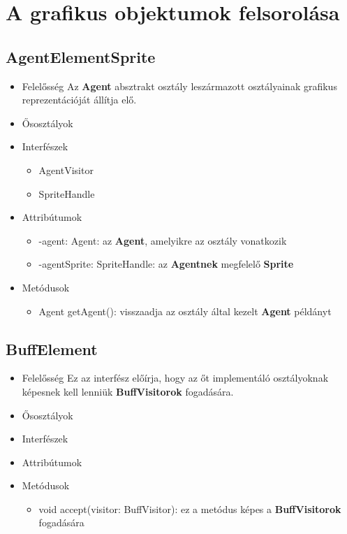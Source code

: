 \section{A grafikus objektumok felsorolása}

\subsection{AgentElementSprite}
\begin{itemize}
\item Felelősség \newline
    Az \textbf{Agent} absztrakt osztály leszármazott osztályainak grafikus reprezentációját állítja elő.
\item Ősosztályok
\item Interfészek
    \begin{itemize}
        \item AgentVisitor
        \item SpriteHandle
    \end{itemize}
\item Attribútumok
    \begin{itemize}
        \item -agent: Agent: az \textbf{Agent}, amelyikre az osztály vonatkozik
        \item -agentSprite: SpriteHandle: az \textbf{Agentnek} megfelelő \textbf{Sprite}
    \end{itemize}
\item Metódusok
	\begin{itemize}
        \item Agent getAgent(): visszaadja az osztály által kezelt \textbf{Agent} példányt
	\end{itemize}
\end{itemize}

\subsection{BuffElement}
\begin{itemize}
\item Felelősség \newline
    Ez az interfész előírja, hogy az őt implementáló osztályoknak képesnek kell lenniük \textbf{BuffVisitorok} fogadására. 
\item Ősosztályok
\item Interfészek
\item Attribútumok
\item Metódusok
	\begin{itemize}
        \item void accept(visitor: BuffVisitor): ez a metódus képes a \textbf{BuffVisitorok} fogadására
	\end{itemize}
\end{itemize}

